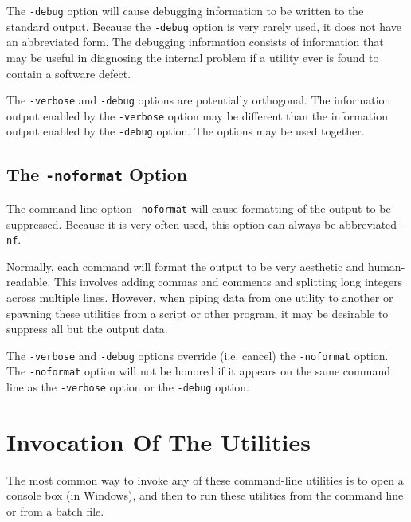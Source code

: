 The \texttt{-debug} option will cause debugging information to be written to 
the standard output.  Because the \texttt{-debug} option is very rarely used,
it does not have an abbreviated form.  The debugging information consists of 
information that may be useful in diagnosing the internal problem if a utility
ever is found to contain a software defect.

The \texttt{-verbose} and \texttt{-debug} options are potentially orthogonal.
The information output enabled by the \texttt{-verbose} option may be different
than the information output enabled by the \texttt{-debug} option.  The options
may be used together.

\subsection{The \texttt{-noformat} Option}
\label{cdcm0:sccl0:snfo0}

The command-line option \texttt{-noformat} will cause formatting of the output to be
suppressed.  Because it is very often used, this option can always be abbreviated
\texttt{-nf}.

Normally, each command will format the output to be very aesthetic and
human-readable.  This involves adding commas and comments and splitting
long integers across multiple lines.  However, when piping data from one
utility to another or spawning these utilities from a script or other program,
it may be desirable to suppress all but the output data.

The \texttt{-verbose} and \texttt{-debug} options override (i.e. cancel)
the \texttt{-noformat} option.  The \texttt{-noformat} option will not be
honored if it appears on the same command line as the 
\texttt{-verbose} option or the \texttt{-debug} option.


\section{Invocation Of The Utilities}

The most common way to invoke any of these command-line utilities is
to open a console box (in Windows), and then to run these utilities
from the command line or from a batch file.

